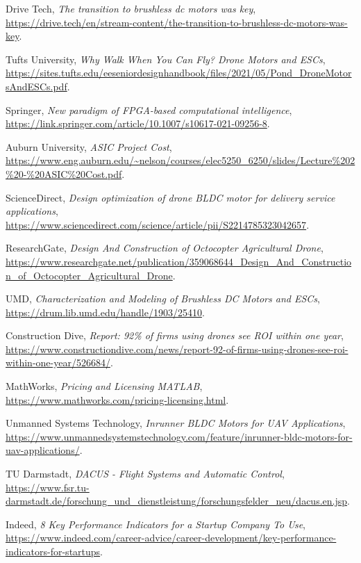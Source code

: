 \documentclass[12pt]{article}
\begin{document}
\begin{thebibliography}{9}
		Drive Tech,
		\textit{The transition to brushless dc motors was key},
		\url{https://drive.tech/en/stream-content/the-transition-to-brushless-dc-motors-was-key}.
		
		Tufts University,
		\textit{Why Walk When You Can Fly? Drone Motors and ESCs},
		\url{https://sites.tufts.edu/eeseniordesignhandbook/files/2021/05/Pond_DroneMotorsAndESCs.pdf}.
		
		Springer,
		\textit{New paradigm of FPGA-based computational intelligence},
		\url{https://link.springer.com/article/10.1007/s10617-021-09256-8}.
		
		Auburn University,
		\textit{ASIC Project Cost},
		\url{https://www.eng.auburn.edu/~nelson/courses/elec5250_6250/slides/Lecture%202%20-%20ASIC%20Cost.pdf}.
		
		ScienceDirect,
		\textit{Design optimization of drone BLDC motor for delivery service applications},
		\url{https://www.sciencedirect.com/science/article/pii/S2214785323042657}.
		
		ResearchGate,
		\textit{Design And Construction of Octocopter Agricultural Drone},
		\url{https://www.researchgate.net/publication/359068644_Design_And_Construction_of_Octocopter_Agricultural_Drone}.
		
		UMD,
		\textit{Characterization and Modeling of Brushless DC Motors and ESCs},
		\url{https://drum.lib.umd.edu/handle/1903/25410}.
		
		Construction Dive,
		\textit{Report: 92\% of firms using drones see ROI within one year},
		\url{https://www.constructiondive.com/news/report-92-of-firms-using-drones-see-roi-within-one-year/526684/}.
		
		MathWorks,
		\textit{Pricing and Licensing MATLAB},
		\url{https://www.mathworks.com/pricing-licensing.html}.
		
		Unmanned Systems Technology,
		\textit{Inrunner BLDC Motors for UAV Applications},
		\url{https://www.unmannedsystemstechnology.com/feature/inrunner-bldc-motors-for-uav-applications/}.
		
		TU Darmstadt,
		\textit{DACUS - Flight Systems and Automatic Control},
		\url{https://www.fsr.tu-darmstadt.de/forschung_und_dienstleistung/forschungsfelder_neu/dacus.en.jsp}.
		
		Indeed,
		\textit{8 Key Performance Indicators for a Startup Company To Use},
		\url{https://www.indeed.com/career-advice/career-development/key-performance-indicators-for-startups}.
		

\end{thebibliography}
\end{document}
